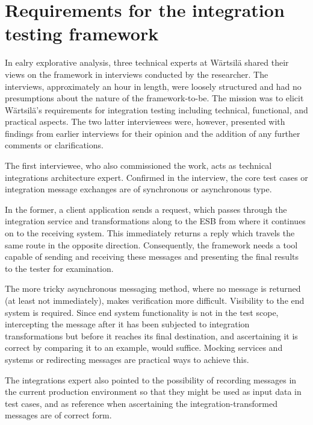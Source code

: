 \documentclass[12pt,a4paper,oneside,pdftex]{report}
\begin{document}

\section{Requirements for the integration testing framework} 
\label{section:requirements}

In ealry explorative analysis, three technical experts at Wärtsilä shared their views on the framework in interviews conducted by the researcher. The interviews, approximately an hour in length, were loosely structured and had no presumptions about the nature of the framework-to-be. The mission was to elicit Wärtsilä's requirements for integration testing including technical, functional, and practical aspects. The two latter interviewees were, however, presented with findings from earlier interviews for their opinion and the addition of any further comments or clarifications.

The first interviewee, who also commissioned the work, acts as technical integrations architecture expert. Confirmed in the interview, the core test cases or integration message exchanges are of synchronous or asynchronous type. 

In the former, a client application sends a request, which passes through the integration service and transformations along to the ESB from where it continues on to the receiving system. This immediately returns a reply which travels the same route in the opposite direction. Consequently, the framework needs a tool capable of sending and receiving these messages and presenting the final results to the tester for examination.

The more tricky asynchronous messaging method, where no message is returned (at least not immediately), makes verification more difficult. Visibility to the end system is required. Since end system functionality is not in the test scope, intercepting the message after it has been subjected to integration transformations but before it reaches its final destination, and ascertaining it is correct by comparing it to an example, would suffice. Mocking services and systems or redirecting messages are practical ways to achieve this.

The integrations expert also pointed to the possibility of recording messages in the current production environment so that they might be used as input data in test cases, and as reference when ascertaining the integration-transformed messages are of correct form. 
\end{document}
